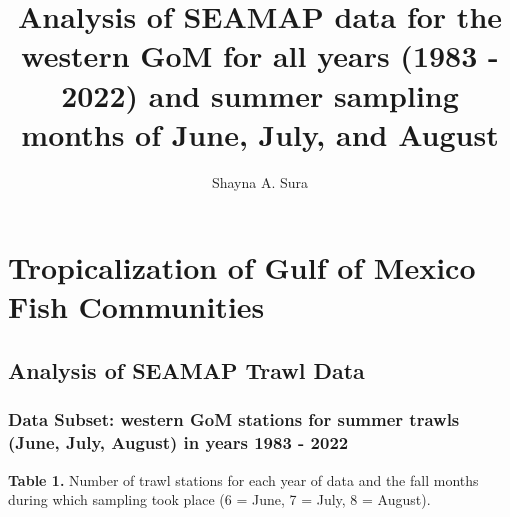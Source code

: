 \documentclass[
  letterpaper,
  DIV=11,
  numbers=noendperiod]{scrartcl}
\title{Analysis of SEAMAP data for the western GoM for all years (1983 -
2022) and summer sampling months of June, July, and August}
\author{Shayna A. Sura}
\date{}
\begin{document}
\maketitle
\ifdefined\Shaded\renewenvironment{Shaded}{\begin{tcolorbox}[boxrule=0pt, borderline west={3pt}{0pt}{shadecolor}, frame hidden, sharp corners, interior hidden, enhanced, breakable]}{\end{tcolorbox}}\fi

\hypertarget{tropicalization-of-gulf-of-mexico-fish-communities}{%
\section{Tropicalization of Gulf of Mexico Fish
Communities}\label{tropicalization-of-gulf-of-mexico-fish-communities}}

\hypertarget{analysis-of-seamap-trawl-data}{%
\subsection{Analysis of SEAMAP Trawl
Data}\label{analysis-of-seamap-trawl-data}}

\hypertarget{data-subset-western-gom-stations-for-summer-trawls-june-july-august-in-years-1983---2022}{%
\subsubsection{Data Subset: western GoM stations for summer trawls
(June, July, August) in years 1983 -
2022}\label{data-subset-western-gom-stations-for-summer-trawls-june-july-august-in-years-1983---2022}}

\newpage

\textbf{Table 1.} Number of trawl stations for each year of data and the
fall months during which sampling took place (6 = June, 7 = July, 8 =
August). \begingroup\fontsize{10}{12}\selectfont
\end{document}
